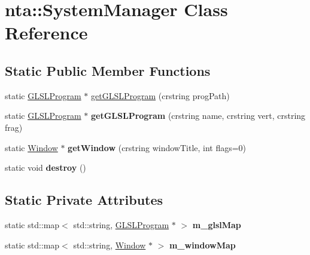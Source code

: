 \hypertarget{classnta_1_1SystemManager}{}\section{nta\+:\+:System\+Manager Class Reference}
\label{classnta_1_1SystemManager}
\subsection*{Static Public Member Functions}
\begin{DoxyCompactItemize}
\item 
static \hyperlink{classnta_1_1GLSLProgram}{G\+L\+S\+L\+Program} $\ast$ \hyperlink{classnta_1_1SystemManager_af37be3ff4538da0a95b5ca257187077c}{get\+G\+L\+S\+L\+Program} (crstring prog\+Path)
\item 
\mbox{\label{classnta_1_1SystemManager_a656e005054ec89f1370616aa499b8a1a}} 
static \hyperlink{classnta_1_1GLSLProgram}{G\+L\+S\+L\+Program} $\ast$ {\bfseries get\+G\+L\+S\+L\+Program} (crstring name, crstring vert, crstring frag)
\item 
\mbox{\label{classnta_1_1SystemManager_af3577fda5a1a1019f51fbc352047dc1f}} 
static \hyperlink{classnta_1_1Window}{Window} $\ast$ {\bfseries get\+Window} (crstring window\+Title, int flags=0)
\item 
\mbox{\label{classnta_1_1SystemManager_a69721eaa78fda16f0f028d2991672282}} 
static void {\bfseries destroy} ()
\end{DoxyCompactItemize}
\subsection*{Static Private Attributes}
\begin{DoxyCompactItemize}
\item 
\mbox{\label{classnta_1_1SystemManager_a22703ea675725af427acc8a19853fb4d}} 
static std\+::map$<$ std\+::string, \hyperlink{classnta_1_1GLSLProgram}{G\+L\+S\+L\+Program} $\ast$ $>$ {\bfseries m\+\_\+glsl\+Map}
\item 
\mbox{\label{classnta_1_1SystemManager_ad19f3250449b0ddad40bf42601d36b1a}} 
static std\+::map$<$ std\+::string, \hyperlink{classnta_1_1Window}{Window} $\ast$ $>$ {\bfseries m\+\_\+window\+Map}
\end{DoxyCompactItemize}


